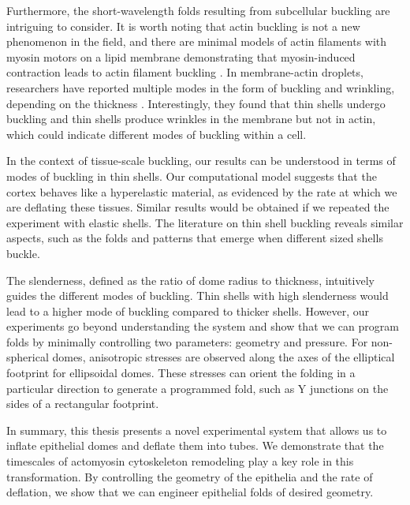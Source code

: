 Furthermore, the short-wavelength folds resulting from subcellular buckling are intriguing to consider. It is worth noting that actin buckling is not a new phenomenon in the field, and there are minimal models of actin filaments with myosin motors on a lipid membrane demonstrating that myosin-induced contraction leads to actin filament buckling \cite{murrell2012, costa2002,  wang2019}. In membrane-actin droplets, researchers have reported multiple modes in the form of buckling and wrinkling, depending on the thickness \cite{kusters2019}. Interestingly, they found that thin shells undergo buckling and thin shells produce wrinkles in the membrane but not in actin, which could indicate different modes of buckling within a cell.

In the context of tissue-scale buckling, our results can be understood in terms of modes of buckling in thin shells. Our computational model suggests that the cortex behaves like a hyperelastic material, as evidenced by the rate at which we are deflating these tissues. Similar results would be obtained if we repeated the experiment with elastic shells. The literature on thin shell buckling reveals similar aspects, such as the folds and patterns that emerge when different sized shells buckle.

The slenderness, defined as the ratio of dome radius to thickness, intuitively guides the different modes of buckling. Thin shells with high slenderness would lead to a higher mode of buckling compared to thicker shells. However, our experiments go beyond understanding the system and show that we can program folds by minimally controlling two parameters: geometry and pressure. For non-spherical domes, anisotropic stresses are observed along the axes of the elliptical footprint for ellipsoidal domes. These stresses can orient the folding in a particular direction to generate a programmed fold, such as Y junctions on the sides of a rectangular footprint.

In summary, this thesis presents a novel experimental system that allows us to inflate epithelial domes and deflate them into tubes. We demonstrate that the timescales of actomyosin cytoskeleton remodeling play a key role in this transformation. By controlling the geometry of the epithelia and the rate of deflation, we show that we can engineer epithelial folds of desired geometry.